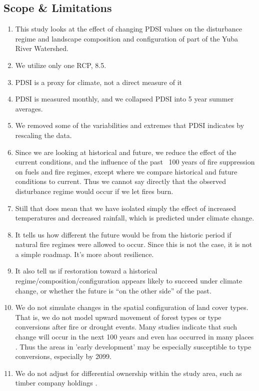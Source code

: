 \documentclass[12pt]{article}
\begin{document}
\begin{spacing}{1}
\subsection*{Scope \& Limitations}
\begin{enumerate}
	\item This study looks at the effect of changing PDSI values on the disturbance regime and landscape composition and configuration of part of the Yuba River Watershed. 
	\item We utilize only one RCP, 8.5.
	\item PDSI is a proxy for climate, not a direct measure of it
	\item PDSI is measured monthly, and we collapsed PDSI into 5 year summer averages.
	\item We removed some of the variabilities and extremes that PDSI indicates by rescaling the data.
	\item Since we are looking at historical and future, we reduce the effect of the current conditions, and the influence of the past ~100 years of fire suppression on fuels and fire regimes, except where we compare historical and future conditions to current. Thus we cannot say directly that the observed disturbance regime would occur if we let fires burn.
	\item Still that does mean that we have isolated simply the effect of increased temperatures and decreased rainfall, which is predicted under climate change.
	\item It tells us how different the future would be from the historic period if natural fire regimes were allowed to occur. Since this is not the case, it is not a simple roadmap. It's more about resilience. 
	\item It also tell us if restoration toward a historical regime/composition/configuration appears likely to succeed under climate change, or whether the future is ``on the other side'' of the past.
	\item We do not simulate changes in the spatial configuration of land cover types. That is, we do not model upward movement of forest types or type conversions after fire or drought events. Many studies indicate that such change will occur in the next 100 years and even has occurred in many places \citep{Bachelet2001}. Thus the areas in 'early development' may be especially susceptible to type conversions, especially by 2099.
	\item We do not adjust for differential ownership within the study area, such as timber company holdings \citep{Nonaka2005}.
\end{enumerate}



\end{spacing}
\end{document}
